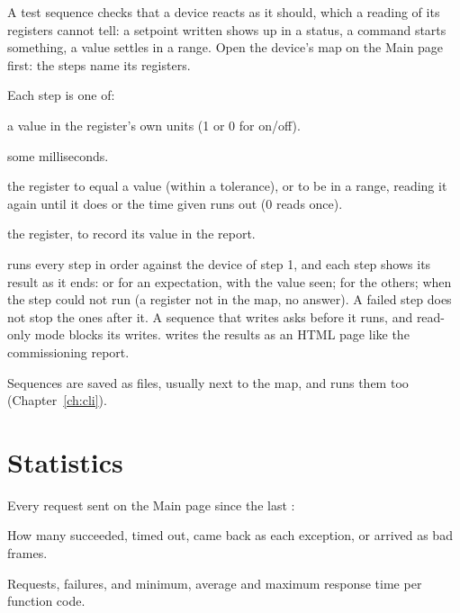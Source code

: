 A test sequence checks that a device reacts as it should, which a reading of
its registers cannot tell: a setpoint written shows up in a status, a command
starts something, a value settles in a range. Open the device's map on the
Main page first: the steps name its registers.

Each step is one of:

\begin{description}[style=nextline, leftmargin=0pt, font=\intermedium]
  \item[Write] a value in the register's own units (1 or 0 for on/off).
  \item[Wait] some milliseconds.
  \item[Expect] the register to equal a value (within a tolerance), or to be
    in a range, reading it again until it does or the time given runs out
    (0 reads once).
  \item[Read] the register, to record its value in the report.
\end{description}

 runs every step in order against the device of step 1, and each step
shows its result as it ends:  or  for an expectation, with
the value seen;  for the others;  when the step could not
run (a register not in the map, no answer). A failed step does not stop the
ones after it. A sequence that writes asks before it runs, and read-only mode
blocks its writes.  writes the results as an HTML page like
the commissioning report.

Sequences are saved as  files, usually next to the map, and
 runs them too (Chapter~\ref{ch:cli}).

\section{Statistics}
\label{sec:statistics}

Every request sent on the Main page since the last :

\begin{description}[style=nextline, leftmargin=0pt, font=\intermedium]
  \item[By result] How many succeeded, timed out, came back as each exception,
    or arrived as bad frames.
  \item[By function] Requests, failures, and minimum, average and maximum
    response time per function code.
\end{description}

